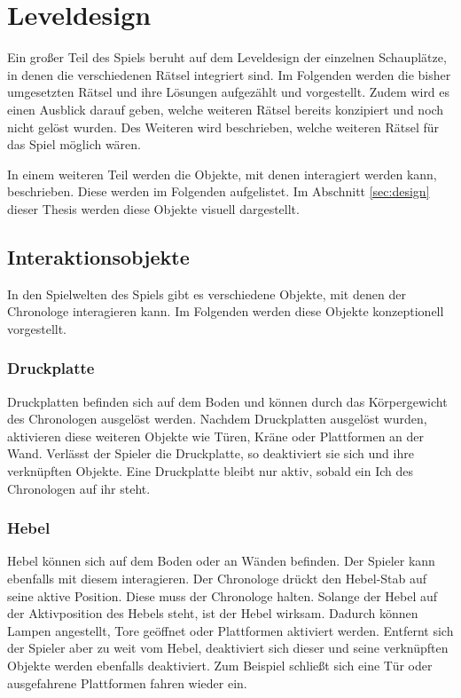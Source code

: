 \section{Leveldesign}
Ein großer Teil des Spiels beruht auf dem Leveldesign der einzelnen Schauplätze, in denen die verschiedenen Rätsel integriert sind. Im Folgenden werden die bisher umgesetzten Rätsel und ihre Lösungen aufgezählt und vorgestellt. Zudem wird es einen Ausblick darauf geben, welche weiteren Rätsel bereits konzipiert und noch nicht gelöst wurden. Des Weiteren wird beschrieben, welche weiteren Rätsel für das Spiel möglich wären.

In einem weiteren Teil werden die Objekte, mit denen interagiert werden kann, beschrieben. Diese werden im Folgenden aufgelistet. Im Abschnitt \ref{sec:design} dieser Thesis werden diese Objekte visuell dargestellt.

\subsection{Interaktionsobjekte}
In den Spielwelten des Spiels gibt es verschiedene Objekte, mit denen der Chronologe interagieren kann. Im Folgenden werden diese Objekte konzeptionell vorgestellt.

\subsubsection{Druckplatte}
Druckplatten befinden sich auf dem Boden und können durch das Körpergewicht des Chronologen ausgelöst werden. Nachdem Druckplatten ausgelöst wurden, aktivieren diese weiteren Objekte wie  Türen, Kräne oder Plattformen an der Wand. Verlässt der Spieler die Druckplatte, so deaktiviert sie sich und ihre verknüpften Objekte. Eine Druckplatte bleibt nur aktiv, sobald ein Ich des Chronologen auf ihr steht. 

\subsubsection{Hebel}
Hebel können sich auf dem Boden oder an Wänden befinden. Der Spieler kann ebenfalls mit diesem interagieren. Der Chronologe drückt den Hebel-Stab auf seine aktive Position. Diese muss der Chronologe halten. Solange der Hebel auf der Aktivposition des Hebels steht, ist der Hebel wirksam. Dadurch können Lampen angestellt, Tore geöffnet oder Plattformen aktiviert werden. Entfernt sich der Spieler aber zu weit vom Hebel, deaktiviert sich dieser und seine verknüpften Objekte werden ebenfalls deaktiviert. Zum Beispiel schließt sich eine Tür oder ausgefahrene Plattformen fahren wieder ein.

